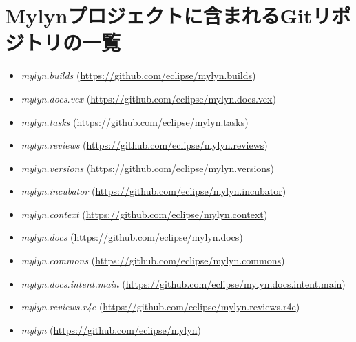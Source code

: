 \documentclass[a4paper]{jsbook}
\begin{document}
\chapter{Mylynプロジェクトに含まれるGitリポジトリの一覧}\label{mylyn_repo_appendix}
\begin{itemize}
\item {\it mylyn.builds} (\url{https://github.com/eclipse/mylyn.builds})
\item {\it mylyn.docs.vex} (\url{https://github.com/eclipse/mylyn.docs.vex})
\item {\it mylyn.tasks} (\url{https://github.com/eclipse/mylyn.tasks})
\item {\it mylyn.reviews} (\url{https://github.com/eclipse/mylyn.reviews})
\item {\it mylyn.versions} (\url{https://github.com/eclipse/mylyn.versions})
\item {\it mylyn.incubator} (\url{https://github.com/eclipse/mylyn.incubator})
\item {\it mylyn.context} (\url{https://github.com/eclipse/mylyn.context})
\item {\it mylyn.docs} (\url{https://github.com/eclipse/mylyn.docs})
\item {\it mylyn.commons} (\url{https://github.com/eclipse/mylyn.commons})
\item {\it mylyn.docs.intent.main} (\url{https://github.com/eclipse/mylyn.docs.intent.main})
\item {\it mylyn.reviews.r4e} (\url{https://github.com/eclipse/mylyn.reviews.r4e})
\item {\it mylyn} (\url{https://github.com/eclipse/mylyn})
\end{itemize}


\backmatter


\end{document}
